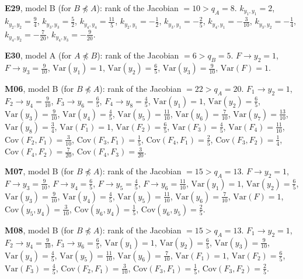 \documentclass[10pt,a4paper]{article}
\newcommand{\nnest}{\not\preceq}
\begin{document}
{\noindent\textbf{E29}, model B (for $B\nnest A$): rank of the Jacobian $=10>q_A=8$. {\footnotesize $k_{y_{1},y_{1}}=2$, $k_{y_{2},y_{2}}=\tfrac{9}{4}$, $k_{y_{3},y_{3}}=\tfrac{5}{2}$, $k_{y_{4},y_{4}}=\tfrac{11}{5}$, $k_{y_{2},y_{1}}=-\tfrac{1}{2}$, $k_{y_{3},y_{1}}=-\tfrac{2}{5}$, $k_{y_{4},y_{1}}=-\tfrac{3}{10}$, $k_{y_{3},y_{2}}=-\tfrac{1}{4}$, $k_{y_{4},y_{2}}=-\tfrac{7}{20}$, $k_{y_{4},y_{3}}=-\tfrac{9}{20}$.}\par\smallskip
\noindent\textbf{E30}, model A (for $A\nnest B$): rank of the Jacobian $=6>q_B=5$. {\footnotesize $F\to y_{2}=1$, $F\to y_{3}=\tfrac{9}{10}$, $\mathrm{Var}(y_{1})=1$, $\mathrm{Var}(y_{2})=\tfrac{6}{5}$, $\mathrm{Var}(y_{3})=\tfrac{9}{10}$, $\mathrm{Var}(F)=1$.}\par\smallskip
\noindent\textbf{M06}, model B (for $B\nnest A$): rank of the Jacobian $=22>q_A=20$. {\footnotesize $F_{1}\to y_{2}=1$, $F_{2}\to y_{4}=\tfrac{9}{10}$, $F_{3}\to y_{6}=\tfrac{6}{5}$, $F_{4}\to y_{8}=\tfrac{4}{5}$, $\mathrm{Var}(y_{1})=1$, $\mathrm{Var}(y_{2})=\tfrac{6}{5}$, $\mathrm{Var}(y_{3})=\tfrac{9}{10}$, $\mathrm{Var}(y_{4})=\tfrac{4}{5}$, $\mathrm{Var}(y_{5})=\tfrac{11}{10}$, $\mathrm{Var}(y_{6})=\tfrac{7}{10}$, $\mathrm{Var}(y_{7})=\tfrac{13}{10}$, $\mathrm{Var}(y_{8})=\tfrac{3}{4}$, $\mathrm{Var}(F_{1})=1$, $\mathrm{Var}(F_{2})=\tfrac{6}{5}$, $\mathrm{Var}(F_{3})=\tfrac{4}{5}$, $\mathrm{Var}(F_{4})=\tfrac{11}{10}$, $\mathrm{Cov}(F_{2},F_{1})=\tfrac{3}{10}$, $\mathrm{Cov}(F_{3},F_{1})=\tfrac{1}{5}$, $\mathrm{Cov}(F_{4},F_{1})=\tfrac{2}{5}$, $\mathrm{Cov}(F_{3},F_{2})=\tfrac{1}{4}$, $\mathrm{Cov}(F_{4},F_{2})=\tfrac{7}{20}$, $\mathrm{Cov}(F_{4},F_{3})=\tfrac{3}{20}$.}\par\smallskip
\noindent\textbf{M07}, model B (for $B\nnest A$): rank of the Jacobian $=15>q_A=13$. {\footnotesize $F\to y_{2}=1$, $F\to y_{3}=\tfrac{9}{10}$, $F\to y_{4}=\tfrac{6}{5}$, $F\to y_{5}=\tfrac{4}{5}$, $F\to y_{6}=\tfrac{11}{10}$, $\mathrm{Var}(y_{1})=1$, $\mathrm{Var}(y_{2})=\tfrac{6}{5}$, $\mathrm{Var}(y_{3})=\tfrac{9}{10}$, $\mathrm{Var}(y_{4})=\tfrac{4}{5}$, $\mathrm{Var}(y_{5})=\tfrac{11}{10}$, $\mathrm{Var}(y_{6})=\tfrac{7}{10}$, $\mathrm{Var}(F)=1$, $\mathrm{Cov}(y_{5},y_{4})=\tfrac{3}{10}$, $\mathrm{Cov}(y_{6},y_{4})=\tfrac{1}{5}$, $\mathrm{Cov}(y_{6},y_{5})=\tfrac{2}{5}$.}\par\smallskip
\noindent\textbf{M08}, model B (for $B\nnest A$): rank of the Jacobian $=15>q_A=13$. {\footnotesize $F_{1}\to y_{2}=1$, $F_{2}\to y_{4}=\tfrac{9}{10}$, $F_{3}\to y_{6}=\tfrac{6}{5}$, $\mathrm{Var}(y_{1})=1$, $\mathrm{Var}(y_{2})=\tfrac{6}{5}$, $\mathrm{Var}(y_{3})=\tfrac{9}{10}$, $\mathrm{Var}(y_{4})=\tfrac{4}{5}$, $\mathrm{Var}(y_{5})=\tfrac{11}{10}$, $\mathrm{Var}(y_{6})=\tfrac{7}{10}$, $\mathrm{Var}(F_{1})=1$, $\mathrm{Var}(F_{2})=\tfrac{6}{5}$, $\mathrm{Var}(F_{3})=\tfrac{4}{5}$, $\mathrm{Cov}(F_{2},F_{1})=\tfrac{3}{10}$, $\mathrm{Cov}(F_{3},F_{1})=\tfrac{1}{5}$, $\mathrm{Cov}(F_{3},F_{2})=\tfrac{2}{5}$.}\par\smallskip
}
\end{document}
